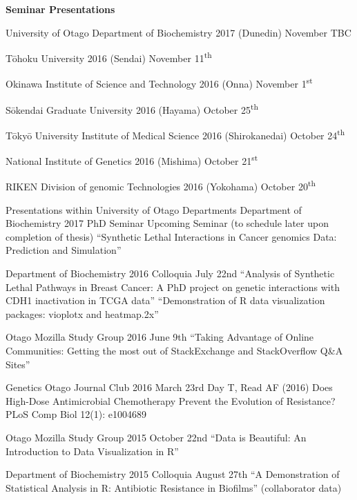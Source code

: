 \clearpage
\textbf{Seminar Presentations}

\begin{small}

University of Otago Department of Biochemistry 2017 (Dunedin) November TBC

T\={o}hoku University 2016 (Sendai) November 11\textsuperscript{th}

Okinawa Institute of Science and Technology 2016 (Onna) November 1\textsuperscript{st}

S\={o}kendai Graduate University 2016 (Hayama) October 25\textsuperscript{th}

T\={o}ky\={o} University Institute of Medical Science 2016 (Shirokanedai) October 24\textsuperscript{th} 

National Institute of Genetics 2016 (Mishima) October 21\textsuperscript{st}

RIKEN Division of \Gls{genomic} Technologies 2016 (Yokohama) October 20\textsuperscript{th}

\end{small}
\fi



\iffalse
Presentations within University of Otago Departments
Department of Biochemistry 2017 PhD Seminar
Upcoming Seminar (to schedule later upon completion of thesis)
``Synthetic Lethal Interactions in Cancer \Glspl{genomic} Data: Prediction and Simulation''

Department of Biochemistry 2016 Colloquia July 22nd
``Analysis of Synthetic Lethal Pathways in Breast Cancer: A PhD project on genetic interactions with CDH1 inactivation in \gls{TCGA} data''
``Demonstration of R data visualization packages: vioplotx and heatmap.2x''

Otago Mozilla Study Group 2016 June 9th
``Taking Advantage of Online Communities: Getting the most out of StackExchange and StackOverflow Q&A Sites''

Genetics Otago Journal Club 2016 March 23rd 
Day T, Read AF (2016) Does High-Dose Antimicrobial Chemotherapy Prevent the Evolution of Resistance? PLoS Comp Biol 12(1): e1004689

Otago Mozilla Study Group 2015 October 22nd
``Data is Beautiful: An Introduction to Data Visualization in R''

Department of Biochemistry 2015 Colloquia August 27th
``A Demonstration of Statistical Analysis in R: Antibiotic Resistance in Biofilms'' (collaborator data)

